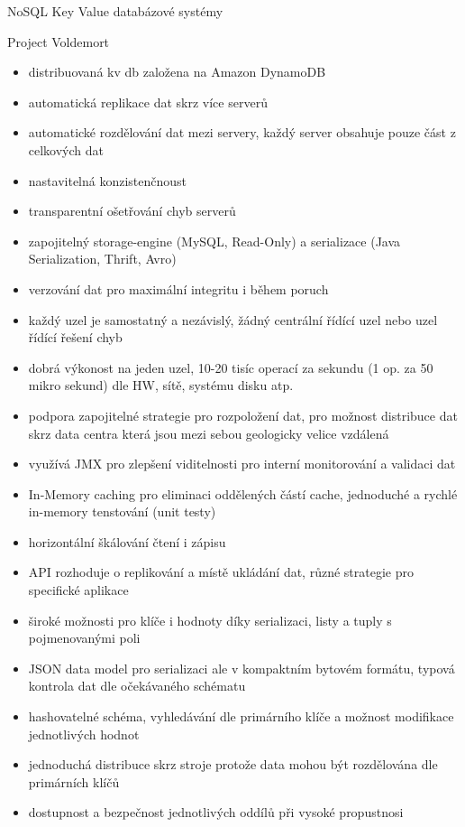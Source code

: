 \documentclass{article}
\begin{document}
\begin{section}{NoSQL Key Value databázové systémy}
		\begin{subsection}{Project Voldemort}
			\begin{itemize}
				\item distribuovaná kv db založena na Amazon DynamoDB
				\item automatická replikace dat skrz více serverů
				\item automatické rozdělování dat mezi servery, každý server obsahuje pouze část z celkových dat
				\item nastavitelná konzistenčnoust
				\item transparentní ošetřování chyb serverů
				\item zapojitelný storage-engine (MySQL, Read-Only) a serializace (Java Serialization, Thrift, Avro) 
				\item verzování dat pro maximální integritu i během poruch
				\item každý uzel je samostatný a nezávislý, žádný centrální řídící uzel nebo uzel řídící řešení chyb
				\item dobrá výkonost na jeden uzel, 10-20 tisíc operací za sekundu (1 op. za 50 mikro sekund) dle HW, sítě, systému disku atp.
				\item podpora zapojitelné strategie pro rozpoložení dat, pro možnost distribuce dat skrz data centra která jsou mezi sebou geologicky velice vzdálená
				\item využívá JMX pro zlepšení viditelnosti pro interní monitorování a validaci dat
				\item In-Memory caching pro eliminaci oddělených částí cache, jednoduché a rychlé in-memory tenstování (unit testy)
				\item horizontální škálování čtení i zápisu
				\item API rozhoduje o replikování a místě ukládání dat, různé strategie pro specifické aplikace
				\item široké možnosti pro klíče i hodnoty díky serializaci, listy a tuply s pojmenovanými poli
				\item JSON data model pro serializaci ale v kompaktním bytovém formátu, typová kontrola dat dle očekávaného schématu
				\item hashovatelné schéma, vyhledávání dle primárního klíče a možnost modifikace jednotlivých hodnot
				\item jednoduchá distribuce skrz stroje protože data mohou být rozdělována dle primárních klíčů
				\item dostupnost a bezpečnost jednotlivých oddílů při vysoké propustnosi
			\end{itemize}
		\end{subsection}
	\end{section}
	 	 	 
\end{document}
